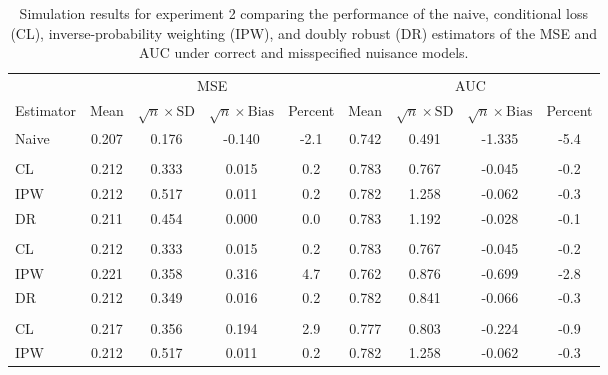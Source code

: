\begin{table}[t]
    \centering
    \footnotesize
    \caption{Simulation results for experiment 2 comparing the performance of the naive, conditional loss (CL), inverse-probability weighting (IPW), and doubly robust (DR) estimators of the MSE and AUC under correct and misspecified nuisance models.}
 
\begin{threeparttable}
    \begin{tabular}{lcccccccc}
    \toprule
    \multicolumn{1}{c}{ } & \multicolumn{4}{c}{MSE} & \multicolumn{4}{c}{AUC} \\
    \cmidrule(l{3pt}r{3pt}){2-5} \cmidrule(l{3pt}r{3pt}){6-9}
    Estimator & Mean & $\sqrt{n}\times\text{SD}$ & $\sqrt{n}\times\text{Bias}$ & Percent & Mean & $\sqrt{n}\times\text{SD}$ & $\sqrt{n}\times\text{Bias}$ & Percent\\
    \midrule
    Naive & 0.207 & 0.176 & -0.140 & -2.1 & 0.742 & 0.491 & -1.335 & -5.4\\
    \addlinespace[0.3em]
    \multicolumn{9}{l}{Correct}\\
    \hspace{1em}CL & 0.212 & 0.333 & 0.015 & 0.2 & 0.783 & 0.767 & -0.045 & \vphantom{1} -0.2\\
    \hspace{1em}IPW & 0.212 & 0.517 & 0.011 & 0.2 & 0.782 & 1.258 & -0.062 & \vphantom{1} -0.3\\
    \hspace{1em}DR & 0.211 & 0.454 & 0.000 & 0.0 & 0.783 & 1.192 & -0.028 & -0.1\\
    \addlinespace[0.3em]
    \multicolumn{9}{l}{$e_a(X)$ misspecified}\\
    \hspace{1em}CL & 0.212 & 0.333 & 0.015 & 0.2 & 0.783 & 0.767 & -0.045 & -0.2\\
    \hspace{1em}IPW & 0.221 & 0.358 & 0.316 & 4.7 & 0.762 & 0.876 & -0.699 & -2.8\\
    \hspace{1em}DR & 0.212 & 0.349 & 0.016 & 0.2 & 0.782 & 0.841 & -0.066 & -0.3\\
    \addlinespace[0.3em]
    \multicolumn{9}{l}{$h_a(X)$ misspecified}\\
    \hspace{1em}CL & 0.217 & 0.356 & 0.194 & 2.9 & 0.777 & 0.803 & -0.224 & -0.9\\
    \hspace{1em}IPW & 0.212 & 0.517 & 0.011 & 0.2 & 0.782 & 1.258 & -0.062 & -0.3\\

\end{tabular}
\end{threeparttable}
\end{table}
